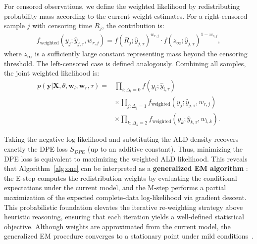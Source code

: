\documentclass[sigconf]{acmart}
\begin{document}
For censored observations, we define the weighted likelihood by redistributing probability mass according to the current weight estimates. For a right-censored sample $j$ with censoring time $R_j$, the contribution is:
\begin{align*}
f_{\text{weighted}}(y_j; \hat{y}_{j,\tau}, w_{r,j}) = f(R_j; \hat{y}_{j,\tau})^{w_{r,j}} \cdot f(z_\infty; \hat{y}_{j,\tau})^{1-w_{r,j}},
\end{align*}
where $z_\infty$ is a sufficiently large constant representing mass beyond the censoring threshold. The left-censored case is defined analogously. Combining all samples, the joint weighted likelihood is:
\begin{align*}
p(\mathbf{y}|\mathbf{X}, \theta, \mathbf{w}_l, \mathbf{w}_r, \tau) = &\prod_{i: \Delta_i=0} f(y_i; \hat{y}_{i,\tau}) \\
&\times \prod_{j: \Delta_j=1} f_{\text{weighted}}(y_j; \hat{y}_{j,\tau}, w_{r,j}) \\
&\times \prod_{k: \Delta_k=2} f_{\text{weighted}}(y_k; \hat{y}_{k,\tau}, w_{l,k}).
\end{align*}


Taking the negative log-likelihood and substituting the ALD density recovers exactly the DPE loss $S_{DPE}$ (up to an additive constant). Thus, minimizing the DPE loss is equivalent to maximizing the weighted ALD likelihood. This reveals that Algorithm~\ref{alg:one} can be interpreted as a \textbf{generalized EM algorithm} \citep{pearce2022censored}: the E-step computes the redistribution weights by evaluating the conditional expectations under the current model, and the M-step performs a partial maximization of the expected complete-data log-likelihood via gradient descent. This probabilistic foundation elevates the iterative re-weighting strategy above heuristic reasoning, ensuring that each iteration yields a well-defined statistical objective.
Although weights are approximated from the current model, the 
generalized EM procedure converges to a stationary point 
under mild conditions~\cite{wu1983convergence}.

\end{document}
